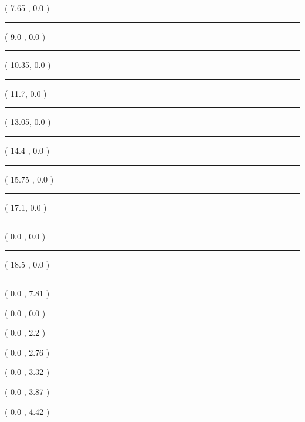 \documentclass[a4paper]{article}
\begin{document}
\begin{examcopy}[1]
{{{{%
\begin{textblock}{12}( 7.65 , 0.0 )
    \rule{.1pt}{145mm}
\end{textblock}
\begin{textblock}{12}( 9.0 , 0.0 )
    \rule{.1pt}{145mm}
\end{textblock}         
\begin{textblock}{12}( 10.35, 0.0 )
    \rule{.1pt}{145mm}
\end{textblock}
\begin{textblock}{12}( 11.7, 0.0 )
    \rule{.1pt}{145mm}
\end{textblock} 
\begin{textblock}{12}( 13.05, 0.0 )
    \rule{.1pt}{145mm}
\end{textblock}  
\begin{textblock}{12}( 14.4 , 0.0 )
    \rule{.1pt}{145mm}
\end{textblock}
\begin{textblock}{12}( 15.75 , 0.0 )
    \rule{.1pt}{145mm}
\end{textblock}
\begin{textblock}{12}( 17.1, 0.0 )
    \rule{.1pt}{145mm}
\end{textblock}
\begin{textblock}{18.5}( 0.0 , 0.0 )
    \rule{.1pt}{145mm}
\end{textblock}
\begin{textblock}{12}( 18.5 , 0.0 )
    \rule{.1pt}{145mm}
\end{textblock}
\begin{textblock}{18.5}( 0.0 , 7.81 )
    \hrulefill
\end{textblock}
\begin{textblock}{18.5}( 0.0 , 0.0 )
    \noindent\hrulefill
\end{textblock}
\begin{textblock}{18.5}( 0.0 , 2.2 )
    \noindent\hrulefill
\end{textblock}
\begin{textblock}{18.5}( 0.0 , 2.76 )
    \noindent\hrulefill
\end{textblock}
\begin{textblock}{18.5}( 0.0 , 3.32 )
    \noindent\hrulefill
\end{textblock}
\begin{textblock}{18.5}( 0.0 , 3.87 )
    \noindent\hrulefill
\end{textblock}
\begin{textblock}{18.5}( 0.0 , 4.42 )

\end{textblock}}}}}
\end{examcopy}
\end{document}
